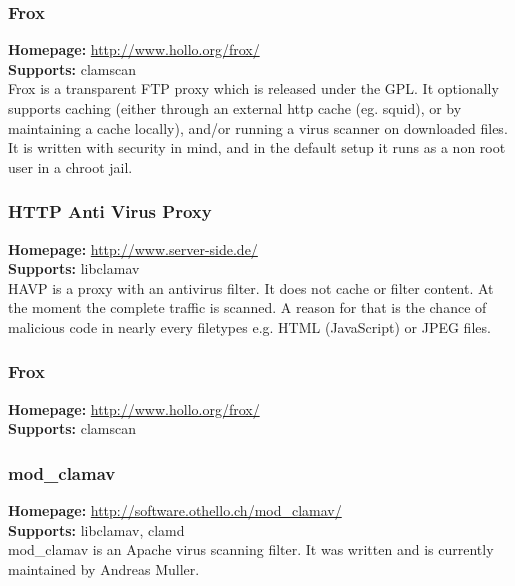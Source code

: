 \documentclass[a4paper,titlepage,12pt]{article}
\begin{document}
    \subsubsection{Frox}
    \textbf{Homepage:} \url{http://www.hollo.org/frox/}\\
    \textbf{Supports:} clamscan\\[4pt]
    Frox is a transparent FTP proxy which is released under the GPL. It
    optionally supports caching (either through an external http cache
    (eg. squid), or by maintaining a cache locally), and/or running a virus
    scanner on downloaded files. It is written with security in mind, and in
    the default setup it runs as a non root user in a chroot jail.

    \subsubsection{HTTP Anti Virus Proxy}
    \textbf{Homepage:} \url{http://www.server-side.de/}\\
    \textbf{Supports:} libclamav\\[4pt]
    HAVP is a proxy with an antivirus filter. It does not cache or filter
    content. At the moment the complete traffic is scanned. A reason for that
    is the chance of malicious code in nearly every filetypes e.g. HTML
    (JavaScript) or JPEG files.

    \subsubsection{Frox}
    \textbf{Homepage:} \url{http://www.hollo.org/frox/}\\
    \textbf{Supports:} clamscan\\[4pt]

    \subsubsection{mod\_clamav}
    \textbf{Homepage:} \url{http://software.othello.ch/mod_clamav/}\\
    \textbf{Supports:} libclamav, clamd\\[4pt]
    mod\_clamav is an Apache virus scanning filter. It was written
    and is currently maintained by Andreas Muller.
\end{document}
